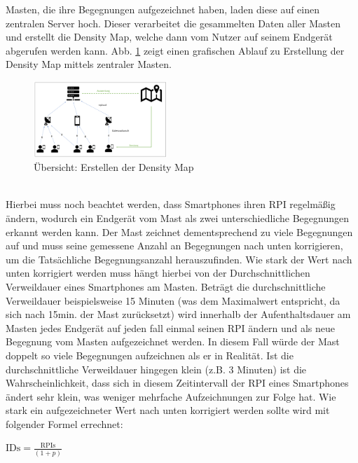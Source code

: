 \documentclass[conference]{IEEEtran}
\begin{document}
Masten, die ihre Begegnungen aufgezeichnet haben, laden diese auf einen zentralen Server hoch. 
Dieser verarbeitet die gesammelten Daten aller Masten und erstellt die Density Map, welche dann vom Nutzer auf seinem Endgerät abgerufen werden kann.
Abb. \ref{density_creation} zeigt einen grafischen Ablauf zu Erstellung der Density Map mittels zentraler Masten. \\
\begin{figure}[h]
	\centering
	\includegraphics[width=0.45\textwidth]{"Density_Map_Overview"}
	\caption{Übersicht: Erstellen der Density Map}
	\label{density_creation}
\end{figure} 
\\
Hierbei muss noch beachtet werden, dass Smartphones ihren RPI regelmäßig ändern, wodurch ein Endgerät vom Mast als zwei unterschiedliche Begegnungen erkannt werden kann. 
Der Mast zeichnet dementsprechend zu viele Begegnungen auf und muss seine gemessene Anzahl an Begegnungen nach unten korrigieren, um die Tatsächliche Begegnungsanzahl herauszufinden. 
Wie stark der Wert nach unten korrigiert werden muss hängt hierbei von der Durchschnittlichen Verweildauer eines Smartphones am Masten. 
Beträgt die durchschnittliche Verweildauer beispielsweise 15 Minuten (was dem Maximalwert entspricht, da sich nach 15min. der Mast zurücksetzt) wird innerhalb der Aufenthaltsdauer am Masten jedes Endgerät auf jeden fall einmal seinen RPI ändern und als neue Begegnung vom Masten aufgezeichnet werden. 
In diesem Fall würde der Mast doppelt so viele Begegnungen aufzeichnen als er in Realität. 
Ist die durchschnittliche Verweildauer hingegen klein (z.B. 3 Minuten) ist die Wahrscheinlichkeit,  dass sich in diesem Zeitintervall  der RPI eines Smartphones ändert sehr klein, was weniger mehrfache Aufzeichnungen zur Folge hat. 
Wie stark ein aufgezeichneter Wert nach unten korrigiert werden sollte wird mit folgender Formel errechnet: 

\centerline{$\text{IDs} = \frac{\text{RPIs}}{(1+p)}  $}
\end{document}
